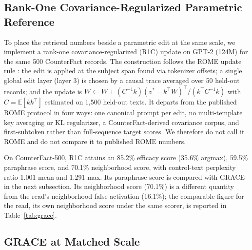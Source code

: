 \documentclass[preprint,12pt]{elsarticle}
\begin{document}
\subsection{Rank-One Covariance-Regularized Parametric Reference}
\label{sec:counterfact_rome}

To place the retrieval numbers beside a parametric edit at the same scale, we implement a rank-one covariance-regularized (R1C) update on GPT-2 (124M) for the same 500 CounterFact records. The construction follows the ROME update rule \cite{meng2022locating}: the edit is applied at the subject span found via tokenizer offsets; a single global edit layer (layer 3) is chosen by a causal trace averaged over 50 held-out records; and the update is $W \leftarrow W + (C^{-1}k)(v^*-k^{\top}W)^{\top}/(k^{\top}C^{-1}k)$ with $C=\mathbb{E}[kk^{\top}]$ estimated on 1,500 held-out texts. It departs from the published ROME protocol in four ways: one canonical prompt per edit, no multi-template key averaging or KL regularizer, a CounterFact-derived covariance corpus, and first-subtoken rather than full-sequence target scores. We therefore do not call it ROME and do not compare it to published ROME numbers.

On CounterFact-500, R1C attains an 85.2\% efficacy score (35.6\% argmax), 59.5\% paraphrase score, and 70.1\% neighborhood score, with control-text perplexity ratio 1.001 mean and 1.291 max. Its paraphrase score is compared with GRACE in the next subsection. Its neighborhood score (70.1\%) is a different quantity from the read's neighborhood false activation (16.1\%); the comparable figure for the read, its own neighborhood score under the same scorer, is reported in Table~\ref{tab:grace}.

\subsection{GRACE at Matched Scale}
\label{sec:grace}
\end{document}

